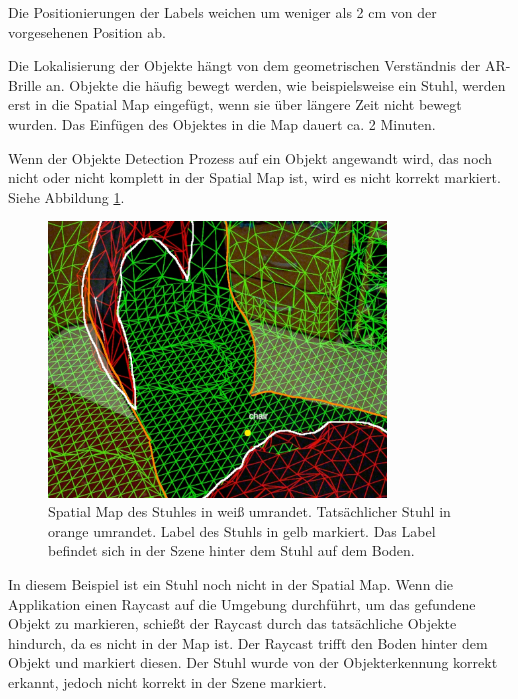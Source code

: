 Die Positionierungen der Labels weichen um weniger als 2 cm von der vorgesehenen Position ab.


%

Die Lokalisierung der Objekte hängt von dem geometrischen Verständnis der AR-Brille an. Objekte die häufig bewegt werden, wie beispielsweise ein Stuhl, werden erst in die Spatial Map eingefügt, wenn sie über längere Zeit nicht bewegt wurden. Das Einfügen des Objektes in die Map dauert ca. 2 Minuten. 

Wenn der Objekte Detection Prozess auf ein Objekt angewandt wird, das noch nicht oder nicht komplett in der Spatial Map ist, wird es nicht korrekt markiert. Siehe Abbildung \ref{img:stuhl}. 

\begin{figure}[H]
	\centering
	\includegraphics[width=0.8\textwidth]{images/ML_20201004_19.18.02_sup.jpg}
	\caption[Label  setzten, bei fehlerhafter Spatial Map]{Spatial Map des Stuhles in weiß umrandet. Tatsächlicher Stuhl in orange umrandet. Label des Stuhls in gelb markiert. Das Label befindet sich in der Szene hinter dem Stuhl auf dem Boden.}
	\label{img:stuhl}
\end{figure}

In diesem Beispiel ist ein Stuhl noch nicht in der Spatial Map. Wenn die Applikation einen Raycast auf die Umgebung durchführt, um das gefundene Objekt zu markieren, schießt der Raycast durch das tatsächliche Objekte hindurch, da es  nicht in der Map ist. Der Raycast trifft den Boden hinter dem Objekt und markiert diesen. Der Stuhl wurde von der Objekterkennung korrekt erkannt, jedoch nicht korrekt in der Szene markiert.


